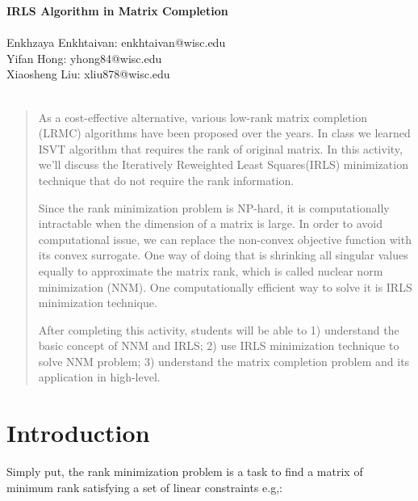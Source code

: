 \documentclass[12pt]{article}
\begin{document}
\begin{center}
{\large \textbf{IRLS Algorithm in Matrix Completion}}\\
\mbox{ }\\
Enkhzaya Enkhtaivan: enkhtaivan@wisc.edu\\
Yifan Hong: yhong84@wisc.edu\\
Xiaosheng Liu: xliu878@wisc.edu\\
\mbox{ }\\
\end{center}

%
%
  
%

\begin{abstract}
As a cost-effective alternative, various low-rank matrix completion (LRMC) algorithms have been proposed over the years. In class we learned ISVT algorithm that requires the rank of original matrix. In this activity, we’ll discuss the Iteratively Reweighted Least Squares(IRLS) minimization technique that do not require the rank information. 

Since the rank minimization problem is NP-hard, it is computationally intractable when the dimension of a matrix is large. In order to avoid computational issue, we can replace the non-convex objective function with its convex surrogate. One way of doing that is shrinking all singular values equally to approximate the matrix rank, which is called nuclear norm minimization (NNM). One computationally efficient way to solve it is IRLS minimization technique. 

After completing this activity, students will be able to 1) understand the basic concept of NNM and IRLS; 2) use IRLS minimization technique to solve NNM problem; 3) understand the matrix completion problem and its application in high-level.

\end{abstract}




\section{Introduction}


Simply put, the rank minimization problem is a task to find a matrix of minimum rank satisfying a set of linear constraints e.g,:
\end{document}
